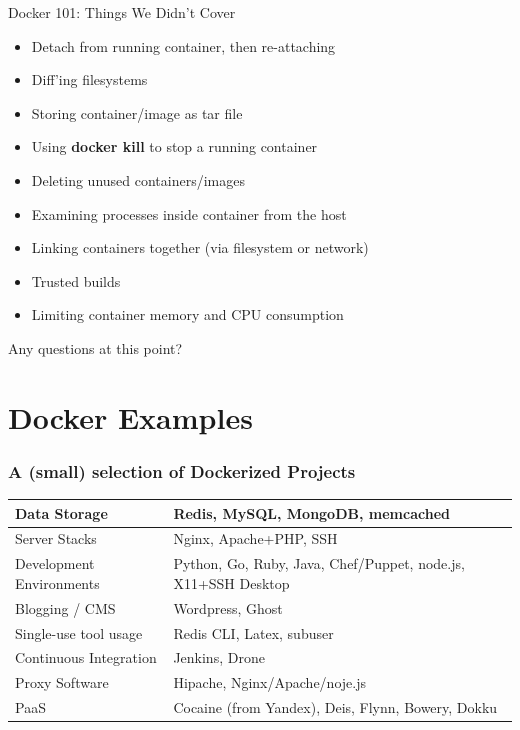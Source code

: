 \documentclass[xcolor=dvipsnames]{beamer}
\newcommand{\cpause}{}
\begin{document}
\begin{frame}{Docker 101: Things We Didn't Cover}  
  
  \cpause
  \begin{itemize}
  \item Detach from running container, then re-attaching \cpause
  \item Diff'ing filesystems \cpause
  \item Storing container/image as tar file \cpause
  \item Using \textbf{docker kill} to stop a running container \cpause
  \item Deleting unused containers/images \cpause
  \item Examining processes inside container from the host \cpause
  \item Linking containers together (via filesystem or network) \cpause
  \item Trusted builds \cpause
  \item Limiting container memory and CPU consumption \cpause
  \end{itemize}

  \vspace{8mm}
  {\LARGE Any questions at this point? }
\end{frame}

\section{Docker Examples}

\begin{frame}
  \frametitle{A (small) selection of Dockerized Projects}

  \begin{tabular}{p{}|p{}}
  Data Storage             & Redis, MySQL, MongoDB, memcached                              \\ \hline \cpause
  Server Stacks            & Nginx, Apache+PHP, SSH                                        \\ \hline \cpause
  Development \linebreak Environments & Python, Go, Ruby, Java, Chef/Puppet, node.js, X11+SSH Desktop \\ \hline \cpause
  Blogging / CMS           & Wordpress, Ghost                                              \\ \hline \cpause
  Single-use tool usage    & Redis CLI, Latex, subuser                                     \\ \hline \cpause
  Continuous Integration   & Jenkins, Drone                                                \\ \hline \cpause
  Proxy Software           & Hipache, Nginx/Apache/noje.js                                 \\ \hline \cpause
  PaaS                     & Cocaine (from Yandex), Deis, Flynn, Bowery, Dokku             \\ 
  \end{tabular}
\end{frame}
\end{document}
